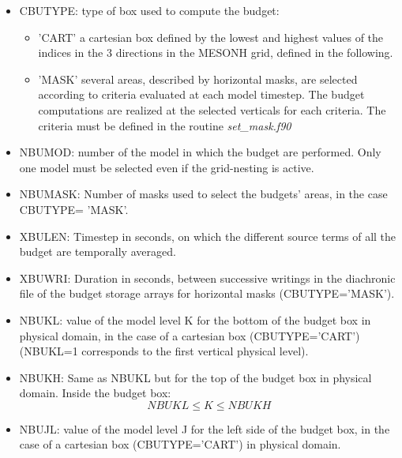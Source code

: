 \begin{itemize}

\item
{}
CBUTYPE: type of box used to compute the budget:
\begin{itemize}
\item
'CART' a cartesian box defined by the lowest and highest values of the indices
 in the 3 directions in the MESONH grid, defined in the following.
\item
'MASK' several areas, described by horizontal masks, are selected according to
 criteria evaluated at each model timestep. 
The budget computations are realized at the selected verticals for each
criteria. The criteria must be defined in the routine {\it set\_mask.f90}
\end{itemize}

\item
NBUMOD:  number of the model in which the
budget are performed. Only one model must be selected even if the grid-nesting
is active.

\item
NBUMASK: 
Number of masks used to select the budgets' areas, in the case CBUTYPE= 'MASK'. 

\item
XBULEN: 
Timestep  in seconds, on which the different source terms of all the
budget are temporally averaged.

\item
XBUWRI: 
Duration in seconds, between successive writings in the diachronic file
of the budget storage arrays for horizontal masks (CBUTYPE='MASK').

\item
{}
NBUKL: value of the model level K for the bottom of the budget box in physical domain, in the case
of a cartesian box (CBUTYPE='CART') (NBUKL=1 corresponds to the first vertical physical level).

\item
{}
NBUKH: Same as NBUKL but for the top of the budget box in physical domain. Inside the budget box:
$$ NBUKL \leq K \leq NBUKH $$

\item
{}
NBUJL: value of the model level J for the left side of the budget box, in the case
of a cartesian box (CBUTYPE='CART') in physical domain.


\end{itemize}
